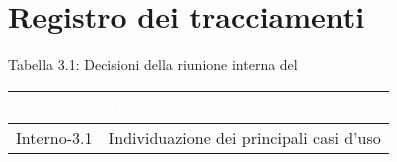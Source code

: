 \section{Registro dei tracciamenti}
{
Tabella 3.1: Decisioni della riunione interna del \Data{}
\renewcommand{\arraystretch}{1.5}
\centering
\begin{longtable}{C{3cm} C{9cm}}
\textcolor{white}{\textbf{Codice}}&
\textcolor{white}{\textbf{Decisione}}\\	
\endhead
		
Interno-3.1 & Individuazione dei principali casi d'uso\\
		
\end{longtable}
}
